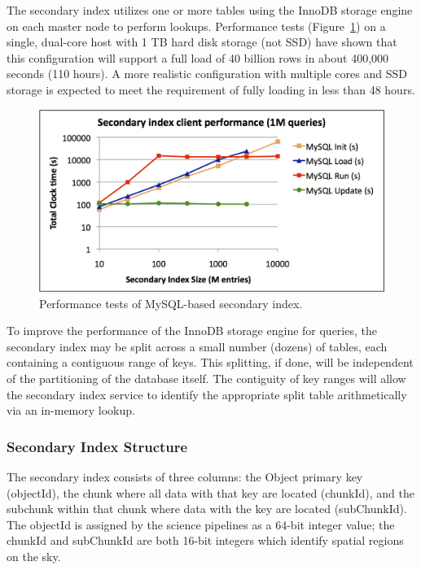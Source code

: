 \documentclass[DM,toc]{lsstdoc}
\begin{document}
The secondary index utilizes one or more tables using the InnoDB storage
engine on each master node to perform lookups. Performance tests
(Figure~\ref{fig:indexing-tests}) on a single, dual-core host with 1 TB hard
disk storage (not SSD) have shown that this configuration will support a full
load of 40 billion rows in about 400,000 seconds (110 hours). A more realistic
configuration with multiple cores and SSD storage is expected to meet the
requirement of fully loading in less than 48 hours.

\begin{figure}[H]
\centering
\includegraphics[width=\textwidth]{_static/indexing_tests.png}
\caption{Performance tests of MySQL-based secondary index. \label{fig:indexing-tests}}
\end{figure}

To improve the performance of the InnoDB storage engine for queries, the
secondary index may be split across a small number (dozens) of tables, each
containing a contiguous range of keys. This splitting, if done, will be
independent of the partitioning of the database itself. The contiguity of key
ranges will allow the secondary index service to identify the appropriate
split table arithmetically via an in-memory lookup.

\subsubsection{Secondary Index Structure}\label{secondary-index-structure}

The secondary index consists of three columns: the Object primary key
(objectId), the chunk where all data with that key are located (chunkId), and
the subchunk within that chunk where data with the key are located
(subChunkId). The objectId is assigned by the science pipelines as a 64-bit
integer value; the chunkId and subChunkId are both 16-bit integers which
identify spatial regions on the sky.
\end{document}
